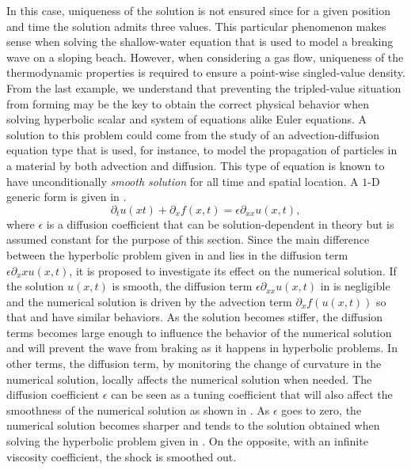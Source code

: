 %
In this case, uniqueness of the solution is not ensured since for a given position and time the solution admits three values. This particular phenomenon makes sense when solving the shallow-water equation that is used to model a breaking wave on a sloping beach. However, when considering a gas flow, uniqueness of the thermodynamic properties is required to ensure a point-wise singled-value density. From the last example, we understand that preventing the tripled-value situation from forming may be the key to obtain the correct physical behavior when solving hyperbolic scalar and system of equations alike Euler equations. A solution to this problem could come from the study of an advection-diffusion equation type that is used, for instance, to model the propagation of particles in a material by both advection and diffusion. This type of equation is known to have unconditionally \emph{smooth solution} for all time and spatial location. A $1$-D generic form is given in .
%
\begin{equation}\label{eq:adv_diff_sct1b}
\partial_t u(xt) + \partial_x f(x,t) = \epsilon \partial_{xx} u(x,t),
\end{equation}
% 
where $\epsilon$ is a diffusion coefficient that can be solution-dependent in theory but is assumed constant for the purpose of this section. Since the main difference between the hyperbolic problem given in  and  lies in the diffusion term $\epsilon \partial_xx u(x,t)$, it is proposed to investigate its effect on the numerical solution. If the solution $u(x,t)$ is smooth, the diffusion term $\epsilon \partial_{xx} u(x,t)$ in  is negligible and the numerical solution is driven by the advection term $\partial_x f(u(x,t))$ so that  and  have similar behaviors. As the solution becomes stiffer, the diffusion terms becomes large enough to influence the behavior of the numerical solution and will prevent the wave from braking as it happens in hyperbolic problems. In other terms, the diffusion term, by monitoring the change of curvature in the numerical solution, locally affects the numerical solution when needed. The diffusion coefficient $\epsilon$ can be seen as a tuning coefficient that will also affect the smoothness of the numerical solution as shown in . As $\epsilon$ goes to zero, the numerical solution becomes sharper and tends to the solution obtained when solving the hyperbolic problem given in . On the opposite, with an infinite viscosity coefficient, the shock is smoothed out.
